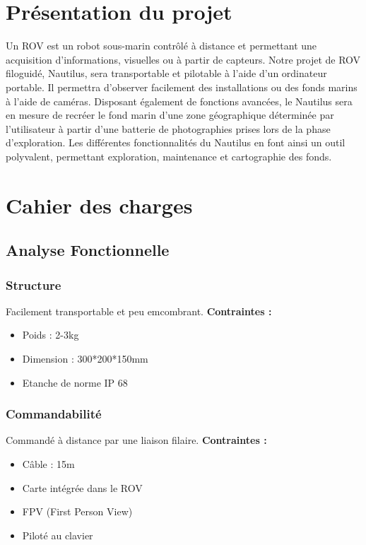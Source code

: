 \documentclass[a4paper,11pt]{report}
\begin{document}
\chapter{Présentation du projet}
        
				Un ROV est un robot sous-marin contrôlé à distance et permettant une acquisition d'informations, visuelles ou à partir de capteurs. Notre projet de ROV filoguidé, Nautilus, sera transportable et pilotable à l'aide d'un ordinateur portable. Il permettra d'observer facilement des installations ou des fonds marins à l'aide de caméras. Disposant également de fonctions avancées, le Nautilus sera en mesure de recréer le fond marin d'une zone géographique déterminée par l'utilisateur à partir d'une batterie de photographies prises lors de la phase d'exploration. Les différentes fonctionnalités du Nautilus en font ainsi un outil polyvalent, permettant exploration, maintenance et cartographie des fonds.
				
				
\chapter{Cahier des charges}

        \section{Analyse Fonctionnelle}
						\subsection{Structure}
								Facilement transportable et peu emcombrant.\newline
								\textbf{Contraintes :}
								\begin{itemize}
										\item Poids : 2-3kg
										\item Dimension : 300*200*150mm
										\item Etanche de norme IP 68 \newline \newline
									\end{itemize}

						\subsection{Commandabilité}
								Commandé à distance par une liaison filaire.\newline
								\textbf{Contraintes :}
								\begin{itemize}
										\item Câble : 15m
										\item Carte intégrée dans le ROV
										\item FPV (First Person View)
										\item Piloté au clavier\newline \newline
								\end{itemize}
\end{document}
